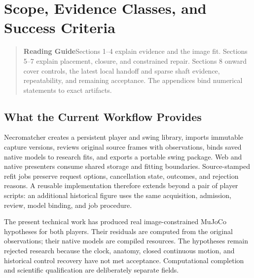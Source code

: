 \documentclass[11pt,letterpaper]{article}
\newcommand{\note}[2]{\begin{quote}\textcolor{accent}{\textbf{#1}}\quad #2\end{quote}}
\newcommand{\reportsection}[1]{\section{#1}}
\begin{document}
{\small\linespread{1.0}\selectfont\setlength{\parskip}{0pt}
\let\contentsaddvspace\addvspace
\renewcommand{\addvspace}[1]{\contentsaddvspace{0.35em}}
\tableofcontents}

\clearpage
\reportsection{Scope, Evidence Classes, and Success Criteria}
\note{Reading Guide}{Sections 1--4 explain evidence and the image fit.
Sections 5--7 explain placement, closure, and constrained repair. Sections
8 onward cover controls, the latest local handoff and sparse shaft evidence,
repeatability, and remaining acceptance. The appendices
bind numerical statements to exact artifacts.}


\subsection{What the Current Workflow Provides}
Necromatcher creates a persistent player and swing library, imports immutable
capture versions, reviews original source frames with observations, binds saved
native models to research fits, and exports a portable swing package. Web and
native presenters consume shared storage and fitting boundaries. Source-stamped
refit jobs preserve request options, cancellation state, outcomes, and rejection
reasons. A reusable implementation therefore extends beyond a pair of player
scripts: an additional historical figure uses the same acquisition, admission,
review, model binding, and job procedure.

The present technical work has produced real image-constrained MuJoCo hypotheses
for both players. Their residuals are computed from the original observations;
their native models are compiled resources. The hypotheses remain rejected
research because the clock, anatomy, closed continuous motion, and historical
control recovery have not met acceptance. Computational completion and scientific
qualification are deliberately separate fields.
\end{document}
